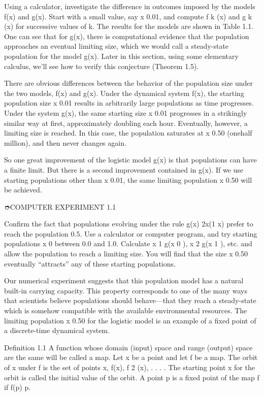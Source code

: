 Using a calculator, investigate the difference in outcomes imposed by the models f(x) and g(x). Start with 
a small value, say x  0.01, and compute f k (x) and g k (x) for successive values of k. The results for the 
models are shown in Table 1.1. One can see that for g(x), there is computational evidence that the 
population approaches an eventual limiting size, which we would call a steady-state population for the 
model g(x). Later in this section, using some elementary calculus, we’ll see how to verify this conjecture 
(Theorem 1.5).

There are obvious differences between the behavior of the population size under the two models, f(x) and 
g(x). Under the dynamical system f(x), the starting population size x  0.01 results in arbitrarily large 
populations as time progresses. Under the system g(x), the same starting size x  0.01 progresses in a 
strikingly similar way at ﬁrst, approximately doubling each hour. Eventually, however, a limiting size is 
reached. In this case, the population saturates at x  0.50 (onehalf million), and then never changes again.

So one great improvement of the logistic model g(x) is that populations can have a ﬁnite limit. But there 
is a second improvement contained in g(x). If we use starting populations other than x  0.01, the same 
limiting population x  0.50 will be achieved.

➮COMPUTER EXPERIMENT 1.1

Conﬁrm the fact that populations evolving under the rule g(x)  2x(1  x) prefer to reach the population 
0.5. Use a calculator or computer program, and try starting populations x 0 between 0.0 and 1.0. Calculate 
x 1  g(x 0 ), x 2  g(x 1 ), etc. and allow the population to reach a limiting size. You will ﬁnd that the 
size x  0.50 eventually “attracts” any of these starting populations.

Our numerical experiment suggests that this population model has a natural built-in carrying capacity. This 
property corresponds to one of the many ways that scientists believe populations should behave—that they 
reach a steady-state which is somehow compatible with the available environmental resources. The limiting 
population x  0.50 for the logistic model is an example of a ﬁxed point of a discrete-time dynamical 
system.

Deﬁnition 1.1 A function whose domain (input) space and range (output) space are the same will be called a 
map. Let x be a point and let f be a map. The orbit of x under f is the set of points x, f(x), f 2 (x), . . 
.  . The starting point x for the orbit is called the initial value of the orbit. A point p is a ﬁxed 
point of the map f if f(p)  p.

